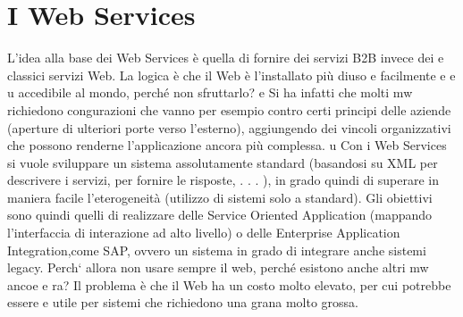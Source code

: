 \section{I Web Services}
L'idea alla base dei Web Services è quella di fornire dei servizi B2B invece dei
e
classici servizi Web. La logica è che il Web è l'installato più diuso e facilmente
e
e
u
accedibile al mondo, perché non sfruttarlo?
e
Si ha infatti che molti mw richiedono congurazioni che vanno per esempio
contro certi principi delle aziende (aperture di ulteriori porte verso l'esterno),
aggiungendo dei vincoli organizzativi che possono renderne l'applicazione ancora
più complessa.
u
Con i Web Services si vuole sviluppare un sistema assolutamente standard
(basandosi su XML per descrivere i servizi, per fornire le risposte, . . . ), in grado quindi di superare in maniera
facile l'eterogeneità (utilizzo di sistemi solo
a
standard). Gli obiettivi sono quindi quelli di realizzare delle Service Oriented
Application (mappando l'interfaccia di interazione ad alto livello) o delle Enterprise Application Integration,come SAP,
ovvero un sistema in grado di integrare
anche sistemi legacy.
Perch` allora non usare sempre il web, perché esistono anche altri mw ancoe
e
ra? Il problema è che il Web ha un costo molto elevato, per cui potrebbe essere
e
utile per sistemi che richiedono una grana molto grossa.

